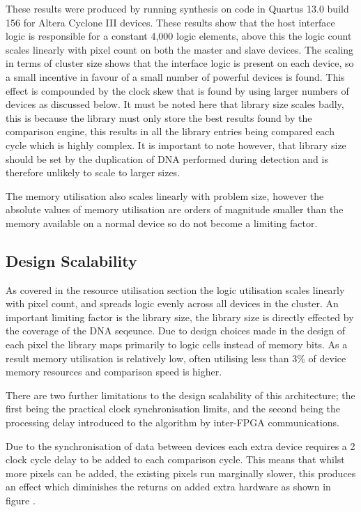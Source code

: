 \documentclass[conference]{IEEEtran}
\begin{document}
These results were produced by running synthesis on code in Quartus 13.0 build 156 for Altera Cyclone III devices. These results show that the host interface logic is responsible for a constant 4,000 logic elements, above this the logic count scales linearly with pixel count on both the master and slave devices. The scaling in terms of cluster size shows that the interface logic is present on each device, so a small incentive in favour of a small number of powerful devices is found. This effect is compounded by the clock skew that is found by using larger numbers of devices as discussed below. It must be noted here that library size scales badly, this is because the library must only store the best results found by the comparison engine, this results in all the library entries being compared each cycle which is highly complex. It is important to note however, that library size should be set by the duplication of DNA performed during detection and is therefore unlikely to scale to larger sizes. 

The memory utilisation also scales linearly with problem size, however the absolute values of memory utilisation are orders of magnitude smaller than the memory available on a normal device so do not become a limiting factor.



\subsection{Design Scalability}

As covered in the resource utilisation section the logic utilisation scales linearly with pixel count, and spreads logic evenly across all devices in the cluster. An important limiting factor is the library size, the library size is directly effected by the coverage of the DNA seqeunce. Due to design choices made in the design of each pixel the library maps primarily to logic cells instead of memory bits. As a result memory utilisation is relatively low, often utilising less than 3\% of device memory resources and comparison speed is higher. 

There are two further limitations to the design scalability of this architecture; the first being the practical clock synchronisation limits, and the second being the processing delay introduced to the algorithm by inter-FPGA communications. 

Due to the synchronisation of data between devices each extra device requires a 2 clock cycle delay to be added to each comparison cycle. This means that whilst more pixels can be added, the existing pixels run marginally slower, this produces an effect which diminishes the returns on added extra hardware as shown in figure \cite{fig:scale}.
\end{document}
